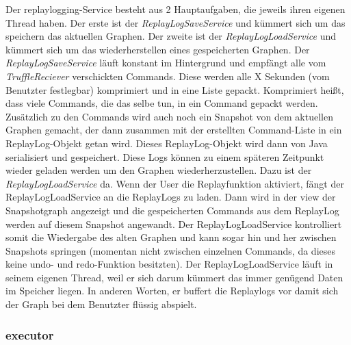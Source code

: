     \medskip
    Der replaylogging-Service besteht aus 2 Hauptaufgaben, die jeweils ihren eigenen Thread haben.
    Der erste ist der \textit{ReplayLogSaveService} und kümmert sich um das speichern das aktuellen
    Graphen. Der zweite ist der \textit{ReplayLogLoadService} und kümmert sich um das
    wiederherstellen eines gespeicherten Graphen.
    \newline
    \newline
    Der \textit{ReplayLogSaveService} läuft konstant im Hintergrund und empfängt alle
    vom \textit{TruffleReciever} verschickten Commands. Diese werden alle X
    Sekunden (vom Benutzter festlegbar) komprimiert und in eine Liste gepackt.
    Komprimiert heißt, dass viele Commands, die das selbe tun, in ein Command
    gepackt werden. Zusätzlich zu den Commands wird auch noch ein Snapshot
    von dem aktuellen Graphen gemacht, der dann zusammen mit der erstellten
    Command-Liste in ein ReplayLog-Objekt getan wird. Dieses
    ReplayLog-Objekt wird dann von Java serialisiert und gespeichert.
    \newline
    \newline
    Diese Logs können zu einem späteren Zeitpunkt wieder geladen werden um den
    Graphen wiederherzustellen. Dazu ist der \textit{ReplayLogLoadService} da. Wenn
    der User die Replayfunktion aktiviert, fängt der ReplayLogLoadService an die
    ReplayLogs zu laden. Dann wird in der view der Snapshotgraph angezeigt
    und die gespeicherten Commands aus dem ReplayLog werden auf
    diesem Snapshot angewandt. Der ReplayLogLoadService kontrolliert somit die
    Wiedergabe des alten Graphen und kann sogar hin und her zwischen Snapshots
    springen (momentan nicht zwischen einzelnen Commands, da dieses keine undo-
    und redo-Funktion besitzten).
    \newline
    \newline
    Der ReplayLogLoadService läuft in seinem eigenen Thread, weil er sich darum
    kümmert das immer genügend Daten im Speicher liegen. In anderen Worten, er
    buffert die Replaylogs vor damit sich der Graph bei dem Benutzter flüssig
    abspielt.

    \subsubsection{executor}
    \label{subsubsec:executor}

